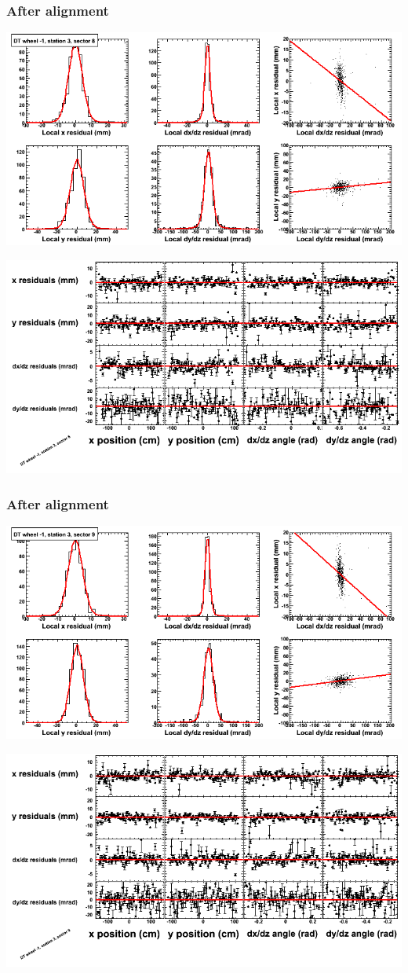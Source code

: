 \documentclass[compress]{beamer}
\begin{document}
\begin{frame}
\frametitle{After alignment}
\includegraphics[width=0.7\linewidth]{NOV4_fitfunctions/MBwhBst3sec08_bellcurves.png}

\includegraphics[width=0.7\linewidth]{NOV4_fitfunctions/MBwhBst3sec08_polynomials.png}
\end{frame}

\begin{frame}
\frametitle{After alignment}
\includegraphics[width=0.7\linewidth]{NOV4_fitfunctions/MBwhBst3sec09_bellcurves.png}

\includegraphics[width=0.7\linewidth]{NOV4_fitfunctions/MBwhBst3sec09_polynomials.png}
\end{frame}
\end{document}
